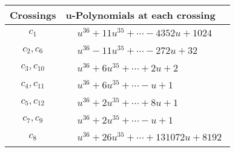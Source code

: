 \documentclass[1p]{elsarticle_modified}
\theoremstyle{definition}
\begin{document}
\begin{tabular}{m{50pt}|m{274pt}}
Crossings & \hspace{64pt}u-Polynomials at each crossing \\
\hline $$\begin{aligned}c_{1}\end{aligned}$$&$\begin{aligned}
&u^{36}+11 u^{35}+\cdots-4352 u+1024
\end{aligned}$\\
\hline $$\begin{aligned}c_{2},c_{6}\end{aligned}$$&$\begin{aligned}
&u^{36}-11 u^{35}+\cdots-272 u+32
\end{aligned}$\\
\hline $$\begin{aligned}c_{3},c_{10}\end{aligned}$$&$\begin{aligned}
&u^{36}+6 u^{35}+\cdots+2 u+2
\end{aligned}$\\
\hline $$\begin{aligned}c_{4},c_{11}\end{aligned}$$&$\begin{aligned}
&u^{36}+6 u^{35}+\cdots- u+1
\end{aligned}$\\
\hline $$\begin{aligned}c_{5},c_{12}\end{aligned}$$&$\begin{aligned}
&u^{36}+2 u^{35}+\cdots+8 u+1
\end{aligned}$\\
\hline $$\begin{aligned}c_{7},c_{9}\end{aligned}$$&$\begin{aligned}
&u^{36}+2 u^{35}+\cdots- u+1
\end{aligned}$\\
\hline $$\begin{aligned}c_{8}\end{aligned}$$&$\begin{aligned}
&u^{36}+26 u^{35}+\cdots+131072 u+8192
\end{aligned}$\\
\hline
\end{tabular}\\~\\
\newpage\renewcommand{\arraystretch}{1}
\end{document}

